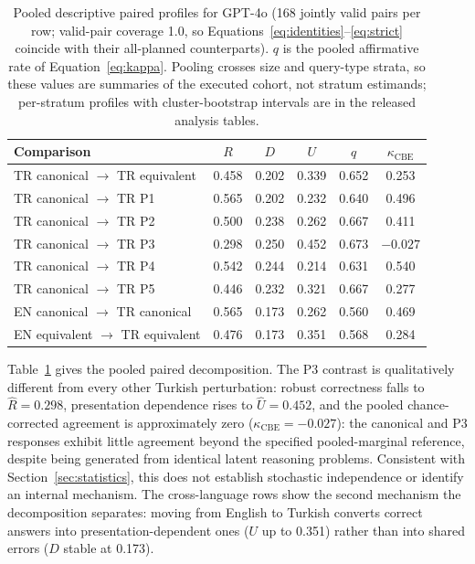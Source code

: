 \begin{table}[t]
  \centering
  \caption{Pooled descriptive paired profiles for GPT-4o (168 jointly valid pairs per row; valid-pair
  coverage 1.0, so Equations~\eqref{eq:identities}--\eqref{eq:strict} coincide with their all-planned
  counterparts). $q$ is the pooled affirmative rate of Equation~\eqref{eq:kappa}. Pooling crosses size and
  query-type strata, so these values are summaries of the executed cohort, not stratum estimands;
  per-stratum profiles with cluster-bootstrap intervals are in the released analysis tables.}
  \label{tab:pilotprofiles}
  \small
  \begin{tabular}{@{}lccccc@{}}
    \toprule
    Comparison & $R$ & $D$ & $U$ & $q$ & $\kappa_{\mathrm{CBE}}$ \\
    \midrule
    TR canonical $\to$ TR equivalent & 0.458 & 0.202 & 0.339 & 0.652 & 0.253 \\
    TR canonical $\to$ TR P1         & 0.565 & 0.202 & 0.232 & 0.640 & 0.496 \\
    TR canonical $\to$ TR P2         & 0.500 & 0.238 & 0.262 & 0.667 & 0.411 \\
    TR canonical $\to$ TR P3         & 0.298 & 0.250 & 0.452 & 0.673 & $-0.027$ \\
    TR canonical $\to$ TR P4         & 0.542 & 0.244 & 0.214 & 0.631 & 0.540 \\
    TR canonical $\to$ TR P5         & 0.446 & 0.232 & 0.321 & 0.667 & 0.277 \\
    EN canonical $\to$ TR canonical  & 0.565 & 0.173 & 0.262 & 0.560 & 0.469 \\
    EN equivalent $\to$ TR equivalent & 0.476 & 0.173 & 0.351 & 0.568 & 0.284 \\
    \bottomrule
  \end{tabular}
\end{table}

Table~\ref{tab:pilotprofiles} gives the pooled paired decomposition. The P3 contrast is qualitatively
different from every other Turkish perturbation: robust correctness falls to $\widehat{R} = 0.298$,
presentation dependence rises to $\widehat{U} = 0.452$, and the pooled chance-corrected agreement is
approximately zero ($\kappa_{\mathrm{CBE}} = -0.027$): the canonical and P3 responses exhibit little
agreement beyond the specified pooled-marginal reference, despite being generated from identical latent
reasoning problems. Consistent with Section~\ref{sec:statistics}, this does not establish stochastic
independence or identify an internal mechanism. The cross-language rows show the second
mechanism the decomposition separates: moving from English to Turkish converts correct answers into
presentation-dependent ones ($U$ up to 0.351) rather than into shared errors ($D$ stable at 0.173).

